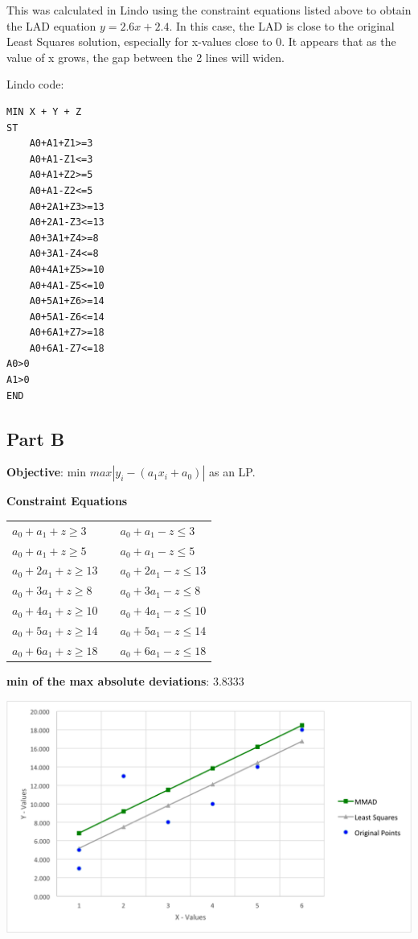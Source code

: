 \documentclass[11pt,letterpaper]{article}
\begin{document}
This was calculated in Lindo using the constraint equations listed above to obtain the LAD equation $y = 2.6x + 2.4$. In this case, the LAD is close to the original Least Squares solution, especially for x-values close to 0. It appears that as the value of x grows, the gap between the 2 lines will widen.\vspace{8pt}

Lindo code:\vspace{8pt}

\begin{verbatim}
MIN X + Y + Z
ST
    A0+A1+Z1>=3
    A0+A1-Z1<=3
    A0+A1+Z2>=5
    A0+A1-Z2<=5
    A0+2A1+Z3>=13
    A0+2A1-Z3<=13
    A0+3A1+Z4>=8
    A0+3A1-Z4<=8
    A0+4A1+Z5>=10
    A0+4A1-Z5<=10
    A0+5A1+Z6>=14
    A0+5A1-Z6<=14
    A0+6A1+Z7>=18
    A0+6A1-Z7<=18
A0>0
A1>0
END
\end{verbatim}

\subsection*{Part B}
\textbf{Objective}: min $max |y_i -  (a_1x_i + a_0)|$ as an LP.\vspace{8pt}

\textbf{Constraint Equations}

\begin{tabular}{l l l}
$a_0+a_1+z\geq3$		&  & $a_0+a_1-z\leq3$\\
$a_0+a_1+z\geq5$ 		& & $a_0+a_1-z\leq5$\\
$a_0+2a_1+z\geq13$	& & $a_0+2a_1-z\leq13$\\
$a_0+3a_1+z\geq8$		& & $a_0+3a_1-z\leq8$\\
$a_0+4a_1+z\geq10$	& & $a_0+4a_1-z\leq10$\\
$a_0+5a_1+z\geq14$	& & $a_0+5a_1-z\leq14$\\
$a_0+6a_1+z\geq18$	& & $a_0+6a_1-z\leq18$\\
\end{tabular}\vspace{8pt}


\textbf{min of the max absolute deviations}: 3.8333\vspace{8pt}

\centerline{\includegraphics[width=7in]{mmad.png}}
\end{document}

